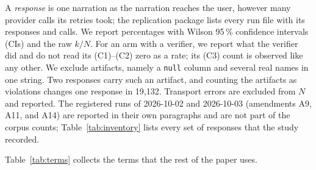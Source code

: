 \documentclass[smallextended,natbib]{svjour3}
\begin{document}
A \emph{response} is one narration as the narration reaches the user,
however many provider calls its retries took; the replication package lists every run file
with its responses and calls. We report percentages with Wilson 95\,\%
confidence intervals (CIs) and the raw $k/N$. For an arm with a verifier, we
report what the verifier did and do not read its (C1)--(C2) zero as a rate;
its (C3) count is observed like any other. We exclude artifacts, namely a
\texttt{null} column and several real names in one string. Two responses carry
such an artifact, and counting the artifacts as violations changes one
response in 19{,}132. Transport errors are excluded from $N$ and reported. The registered
runs of 2026-10-02 and 2026-10-03 (amendments A9, A11, and A14) are reported
in their own paragraphs and are not part of the corpus counts;
Table~\ref{tab:inventory} lists every set of responses that the study
recorded.

\begin{table}[!htbp]
\caption{What the study recorded. A response is one narration as delivered,
after any retries; calls include the retries. The corpus feeds RQ1--RQ5; the
registered runs are reported apart; the audit judges label the 204 items of
the semantic audit (the inference models locally, the LLM judges through
their providers).}
\label{tab:inventory}
\centering
\footnotesize
\setlength{\tabcolsep}{3pt}
\end{table}
Table~\ref{tab:terms} collects the terms that the rest of the paper uses.
\end{document}
